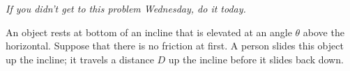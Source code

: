 \documentclass[12pt]{article}
\begin{document}
\Large
\centerline{}
\normalsize
\centerline{}
%
%
%
%
%

\begin{center}
	\small \it If you didn't get to this problem Wednesday, do it today.
\end{center}

 An object rests at bottom of an incline that is elevated at an angle $\theta$ above the horizontal. Suppose that there is no friction at first. A person slides this object up the incline; it travels a distance $D$ up the incline before it slides back down.
\end{document}

